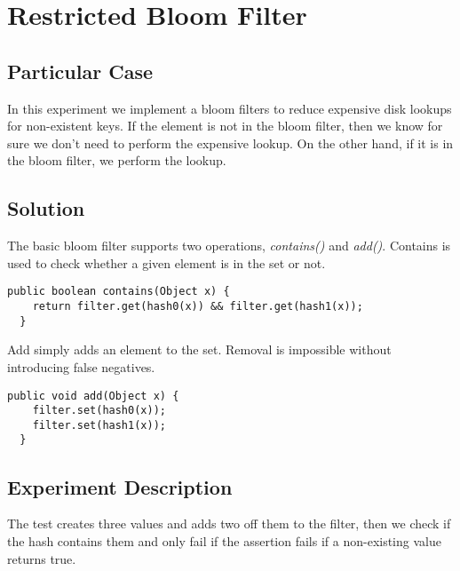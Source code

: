 


\section{\textbf{Restricted Bloom Filter}}



\subsection{Particular Case}
\par
In this experiment we implement a bloom filters to reduce expensive disk lookups for non-existent keys.
If the element is not in the bloom filter, then we know for sure we don't need to perform the expensive lookup. On the other hand, if it is in the bloom filter, we perform the lookup. 
\par



\subsection{Solution}
\par
The basic bloom filter supports two operations, \textit{contains()} and \textit{add()}.
Contains is used to check whether a given element is in the set or not. 
\par
\begin{lstlisting}[frame=single,breaklines=true]
 public boolean contains(Object x) {
    return filter.get(hash0(x)) && filter.get(hash1(x));
  }
\end{lstlisting}
Add simply adds an element to the set. Removal is impossible without introducing false negatives.
\begin{lstlisting}[frame=single,breaklines=true]
  public void add(Object x) {
    filter.set(hash0(x));
    filter.set(hash1(x));
  }
\end{lstlisting}


\subsection{Experiment Description} 
\par
The test creates three values and adds two off them to the filter, then we check if the hash contains them and only fail if the assertion fails if a non-existing value returns true.
\par


